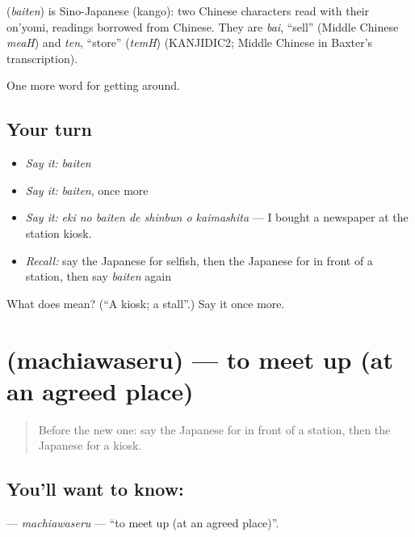 \begin{cousinweb}
\textbf{} (\emph{baiten}) is Sino-Japanese (kango): two Chinese characters read with their on'yomi, readings borrowed from Chinese. They are \emph{bai}, \textquotedblleft{}sell\textquotedblright{} (Middle Chinese \emph{meaH}) and \emph{ten}, \textquotedblleft{}store\textquotedblright{} (\emph{temH}) (KANJIDIC2; Middle Chinese in Baxter's transcription).
\end{cousinweb}

\begin{grammarlens}[title={What you've built}]
One more word for getting around.
\end{grammarlens}

\subsection*{Your turn}
\begin{itemize}
\raggedright
  \item \emph{Say it:} \emph{baiten}
  \item \emph{Say it:} \emph{baiten}, once more
  \item \emph{Say it:} \emph{eki no baiten de shinbun o kaimashita} — I bought a newspaper at the station kiosk.
  \item \emph{Recall:} say the Japanese for selfish, then the Japanese for in front of a station, then say \emph{baiten} again
\end{itemize}

\begin{tcolorbox}[breakable,colback=teal!4,colframe=teal!35!black,title={Before you move on}]
What does  mean? (\textquotedblleft{}A kiosk; a stall\textquotedblright{}.) Say it once more.
\end{tcolorbox}
\section[\texorpdfstring{\ja{まちあわせる} (machiawaseru)}{まちあわせる (machiawaseru)}]{ (machiawaseru) — to meet up (at an agreed place)}

\label{lesson:JA-C372-machiawaseru}



\begin{quote}
Before the new one: say the Japanese for in front of a station, then the Japanese for a kiosk.
\end{quote}

\subsection*{You'll want to know: }
\textbf{} — \emph{machiawaseru} — \textquotedblleft{}to meet up (at an agreed place)\textquotedblright{}.

